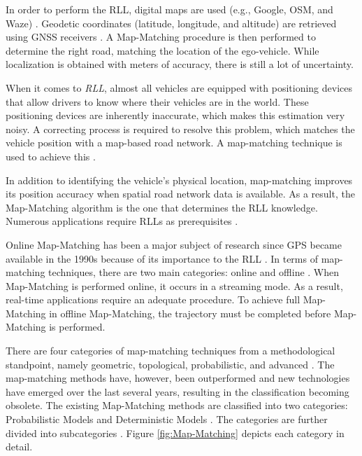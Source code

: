 \documentclass[a4paper,12pt]{article}
\begin{document}
\hspace{5mm} In order to perform the RLL, digital maps are used (e.g., Google, OSM, and Waze) \cite{article32}. Geodetic coordinates (latitude, longitude, and altitude) are retrieved using GNSS receivers \cite{article32}. A Map-Matching procedure is then performed to determine the right road, matching the location of the ego-vehicle. While localization is obtained with meters of accuracy, there is still a lot of uncertainty.

\hspace{5mm} When it comes to \textit R\textit L\textit L, almost all vehicles are equipped with positioning devices that allow drivers to know where their vehicles are in the world. These positioning devices are inherently inaccurate, which makes this estimation very noisy. A correcting process is required to resolve this problem, which matches the vehicle position with a map-based road network. A map-matching technique is used to achieve this \cite{article32}.

\hspace{5mm} In addition to identifying the vehicle's physical location, map-matching improves its position accuracy when spatial road network data is available. As a result, the Map-Matching algorithm is the one that determines the RLL knowledge. Numerous applications require RLLs as prerequisites \cite{article32}.


\hspace{5mm} Online Map-Matching has been a major subject of research since GPS became available in the 1990s because of its importance to the RLL \cite{article32}. In terms of map-matching techniques, there are two main categories: online and offline \cite{article32}. When Map-Matching is performed online, it occurs in a streaming mode. As a result, real-time applications require an adequate procedure. To achieve full Map-Matching in offline Map-Matching, the trajectory must be completed before Map-Matching is performed.

\hspace{5mm} There are four categories of map-matching techniques from a methodological standpoint, namely geometric, topological, probabilistic, and advanced \cite{article32}. The map-matching methods have, however, been outperformed and new technologies have emerged over the last several years, resulting in the classification becoming obsolete. The existing Map-Matching methods are classified into two categories: Probabilistic Models and Deterministic Models \cite{article32}. The categories are further divided into subcategories \cite{article32}. Figure \ref{fig:Map-Matching} depicts each category in detail.
\end{document}
